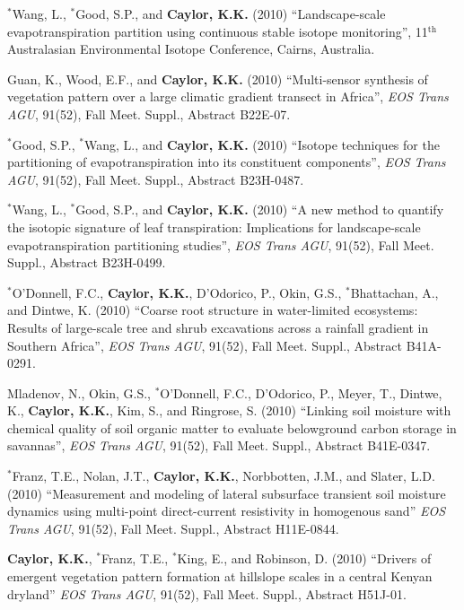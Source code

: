 \documentclass[10pt]{article}
\begin{document}
\begin{etaremune}
\item $^{*}$Wang, L., $^{*}$Good, S.P., and \textbf{Caylor, K.K.} (2010) ``Landscape-scale evapotranspiration partition using continuous stable isotope monitoring'', 11$^{\mbox{th}}$ Australasian Environmental Isotope Conference, Cairns, Australia.

\item Guan, K., Wood, E.F., and \textbf{Caylor, K.K.} (2010) ``Multi-sensor synthesis of vegetation pattern over a large climatic gradient transect in Africa'', \emph{EOS Trans AGU}, 91(52), Fall Meet. Suppl., Abstract B22E-07.

\item $^{*}$Good, S.P., $^{*}$Wang, L., and \textbf{Caylor, K.K.} (2010) ``Isotope techniques for the partitioning of evapotranspiration into its constituent components'', \emph{EOS Trans AGU}, 91(52), Fall Meet. Suppl., Abstract B23H-0487.

\item $^{*}$Wang, L., $^{*}$Good, S.P., and \textbf{Caylor, K.K.} (2010) ``A new method to quantify the isotopic signature of leaf transpiration: Implications for landscape-scale evapotranspiration partitioning studies'', \emph{EOS Trans AGU}, 91(52), Fall Meet. Suppl., Abstract B23H-0499.

\item $^{*}$O'Donnell, F.C., \textbf{Caylor, K.K.}, D'Odorico, P., Okin, G.S., $^{*}$Bhattachan, A., and Dintwe, K. (2010) ``Coarse root structure in water-limited ecosystems: Results of large-scale tree and shrub excavations across a rainfall gradient in Southern Africa'', \emph{EOS Trans AGU}, 91(52), Fall Meet. Suppl., Abstract B41A-0291.

\item Mladenov, N., Okin, G.S., $^{*}$O'Donnell, F.C., D'Odorico, P., Meyer, T., Dintwe, K., \textbf{Caylor, K.K.}, Kim, S., and Ringrose, S. (2010) ``Linking soil moisture with chemical quality of soil organic matter to evaluate belowground carbon storage in savannas'', \emph{EOS Trans AGU}, 91(52), Fall Meet. Suppl., Abstract B41E-0347.

\item $^{*}$Franz, T.E., Nolan, J.T., \textbf{Caylor, K.K.}, Norbbotten, J.M., and Slater, L.D. (2010) ``Measurement and modeling of lateral subsurface transient soil moisture dynamics using multi-point direct-current resistivity in homogenous sand'' \emph{EOS Trans AGU}, 91(52), Fall Meet. Suppl., Abstract H11E-0844.

\item \textbf{Caylor, K.K.}, $^{*}$Franz, T.E., $^{*}$King, E., and Robinson, D. (2010) ``Drivers of emergent vegetation pattern formation at hillslope scales in a central Kenyan dryland'' \emph{EOS Trans AGU}, 91(52), Fall Meet. Suppl., Abstract H51J-01.


\end{etaremune}
\end{document}
